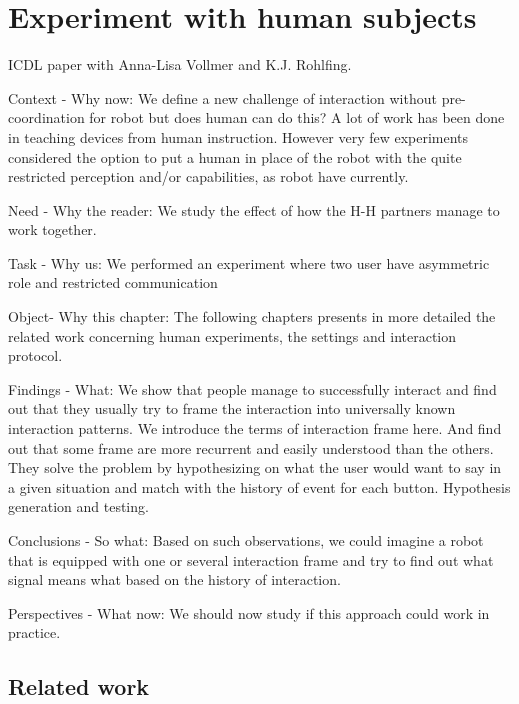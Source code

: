 \renewcommand{\chapterpath}{\allchapterspath/humanexperiment}
\renewcommand{\imgpath}{\chapterpath/img}

\chapter{Experiment with human subjects}
\label{chapter:humanexperiment}
\minitoc

ICDL paper with Anna-Lisa Vollmer and K.J. Rohlfing.

Context - Why now: We define a new challenge of interaction without pre-coordination for robot but does human can do this? A lot of work has been done in teaching devices from human instruction. However very few experiments considered the option to put a human in place of the robot with the quite restricted perception and/or capabilities, as robot have currently.

Need - Why the reader: We study the effect of how the H-H partners manage to work together.

Task - Why us: We performed an experiment where two user have asymmetric role and restricted communication

Object- Why this chapter: The following chapters presents in more detailed the related work concerning human experiments, the settings and interaction protocol.

Findings - What: We show that people manage to successfully interact and find out that they usually try to frame the interaction into universally known interaction patterns. We introduce the terms of interaction frame here. And find out that some frame are more recurrent and easily understood than the others. They solve the problem by hypothesizing on what the user would want to say in a given situation and match with the history of event for each button. Hypothesis generation and testing.

Conclusions - So what: Based on such observations, we could imagine a robot that is equipped with one or several interaction frame and try to find out what signal means what based on the history of interaction.

Perspectives - What now: We should now study if this approach could work in practice.

\section{Related work}

